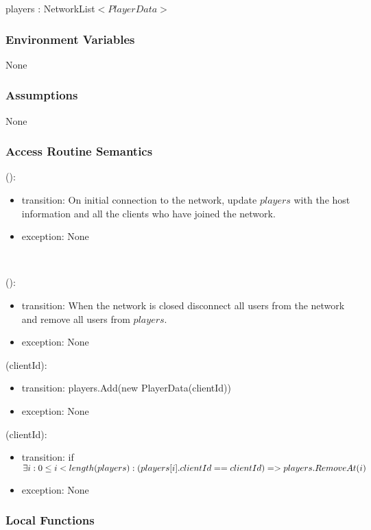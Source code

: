 \documentclass[12pt, titlepage]{article}
\begin{document}
players : NetworkList$<PlayerData>$

\subsubsection{Environment Variables}

None

\subsubsection{Assumptions}

None

\subsubsection{Access Routine Semantics}

():
\begin{itemize}
\item transition: On initial connection to the network, update $players$ with the host information and all the clients who have joined the network.
\item exception: None
\end{itemize}\

():
\begin{itemize}
\item transition: When the network is closed disconnect all users from the network and remove all users from $players$.
\item exception: None
\end{itemize}

(clientId):
\begin{itemize}
\item transition: players.Add(new PlayerData(clientId))
\item exception: None
\end{itemize}

(clientId):
\begin{itemize}
\item transition: if $  \exists i: 0 \leq i < length(players) : \newline (players[i].clientId == clientId) => players.RemoveAt(i) $
\item exception: None
\end{itemize}

\subsubsection{Local Functions}
\end{document}
